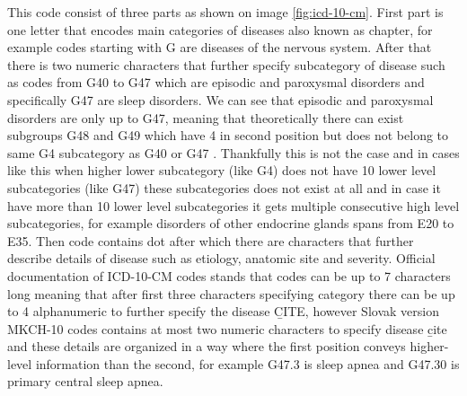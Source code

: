 This code consist of three parts as shown on image \ref{fig:icd-10-cm}. First part is one letter that encodes main categories of diseases also known as chapter, for example codes starting with G are diseases of the nervous system. 
After that there is two numeric characters that further specify subcategory of disease such as codes from G40 to G47 which are episodic and paroxysmal disorders and specifically G47 are sleep disorders. 
We can see that episodic and paroxysmal disorders are only up to G47, meaning that theoretically there can exist subgroups G48 and G49 which have 4 in second position but does not belong to same G4 subcategory as G40 or G47 \label{mkch_subdiv}. Thankfully this is not the case and in cases like this when higher lower subcategory (like G4) does not have 10 lower level subcategories (like G47) these subcategories does not exist at all and in case it have more than 10 lower level subcategories it gets multiple consecutive high level subcategories, for example disorders of other endocrine glands spans from E20 to E35. 
Then code contains dot after which there are characters that further describe details of disease such as etiology, anatomic site and severity. Official documentation of ICD-10-CM codes stands that codes can be up to 7 characters long meaning that after first three characters specifying category there can be up to 4 alphanumeric to further specify the disease \b{CITE}, however Slovak version MKCH-10 codes contains at most two numeric characters to specify disease \b{cite} and these details are organized in a way where the first position conveys higher-level information than the second, for example G47.3 is sleep apnea and G47.30 is primary central sleep apnea.
\\

